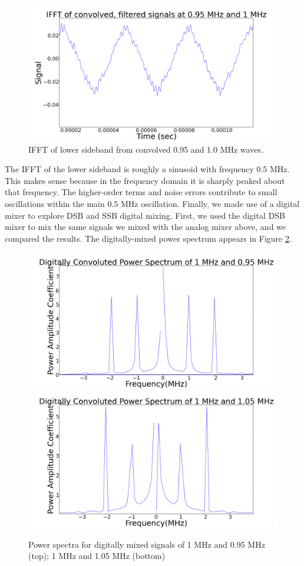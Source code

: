 \documentclass[11pt]{article}
\begin{document}
\begin{figure}
\centering
\includegraphics[scale=0.35]{pictures/ifft}
\caption{IFFT of lower sideband from convolved 0.95 and 1.0 MHz waves. \label{ifft}}
\end{figure}

The IFFT of the lower sideband is roughly a sinusoid with frequency 0.5 MHz. This makes sense because in the frequency domain it is sharply peaked about that frequency. The higher-order terms and noise errors contribute to small oscillations within the main 0.5 MHz oscillation. Finally, we made use of a digital mixer to explore DSB and SSB digital mixing. First, we used the digital DSB mixer to mix the same signals we mixed with the analog mixer above, and we compared the results. The digitally-mixed power spectrum appears in Figure \ref{digpow}.

\begin{figure}
\centering
\includegraphics[scale=0.35]{pictures/digitaloninefive}
\includegraphics[scale=0.35]{pictures/digitaloneofive}
\caption{Power spectra for digitally mixed signals of 1 MHz and 0.95 MHz (top); 1 MHz and 1.05 MHz (bottom) \label{digpow}}
\end{figure}
\end{document}
